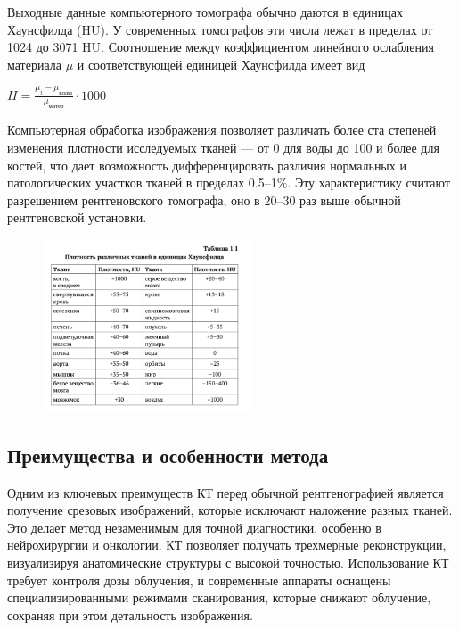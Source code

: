 Выходные данные компьютерного томографа обычно даются в единицах Хаунсфилда (HU). У современных томографов эти числа лежат в пределах от 1024 до 3071 HU. Соотношение между коэффициентом линейного ослабления материала $\mu$ и соответствующей единицей Хаунсфилда имеет вид
\begin{center}
$H = \frac{\mu_i - \mu_{\text{воды}}}{\mu_{\text{матер}}} \cdot 1000$
\end{center}
Компьютерная обработка изображения позволяет различать более ста степеней изменения плотности исследуемых тканей — от 0 для воды до 100 и более для костей, что дает возможность дифференцировать различия нормальных и патологических участков тканей в пределах 0.5–1\%. Эту характеристику считают разрешением рентгеновского томографа, оно в 20–30 раз выше обычной рентгеновской установки\cite{ktmrt}.

\begin{figure}[H]
    \centering
    \includegraphics[width=0.55\textwidth]{pic/5.png}
\end{figure}

\subsection{Преимущества и особенности метода}

Одним из ключевых преимуществ КТ перед обычной рентгенографией является получение срезовых изображений, которые исключают наложение разных тканей. Это делает метод незаменимым для точной диагностики, особенно в нейрохирургии и онкологии. КТ позволяет получать трехмерные реконструкции, визуализируя анатомические структуры с высокой точностью. Использование КТ требует контроля дозы облучения, и современные аппараты оснащены специализированными режимами сканирования, которые снижают облучение, сохраняя при этом детальность изображения\cite{ktmrt}.

